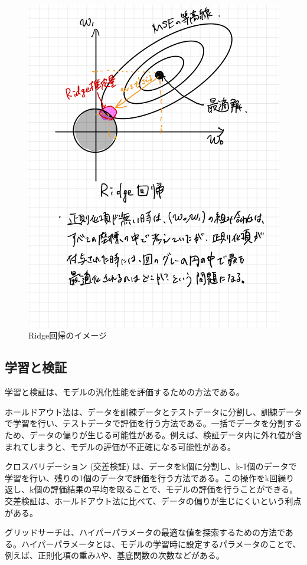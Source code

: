 \documentclass{ltjsarticle}
\begin{document}
\begin{figure}[htbp]
  \centering
  \includegraphics[width=13cm]{capture/Ridge回帰.png}
  \caption{Ridge回帰のイメージ}
\end{figure}

\newpage

\subsection{学習と検証}
学習と検証は、モデルの汎化性能を評価するための方法である。
\par
ホールドアウト法は、データを訓練データとテストデータに分割し、訓練データで学習を行い、テストデータで評価を行う方法である。一括でデータを分割するため、データの偏りが生じる可能性がある。例えば、検証データ内に外れ値が含まれてしまうと、モデルの評価が不正確になる可能性がある。
\par
クロスバリデーション (交差検証) は、データをk個に分割し、k-1個のデータで学習を行い、残りの1個のデータで評価を行う方法である。この操作をk回繰り返し、k個の評価結果の平均を取ることで、モデルの評価を行うことができる。
交差検証は、ホールドアウト法に比べて、データの偏りが生じにくいという利点がある。
\par
グリッドサーチは、ハイパーパラメータの最適な値を探索するための方法である。ハイパーパラメータとは、モデルの学習時に設定するパラメータのことで、例えば、正則化項の重み$\lambda$や、基底関数の次数などがある。
\end{document}
